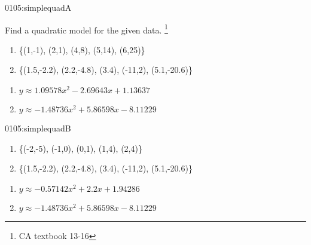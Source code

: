 
\begin{defproblem}{0105:simplequadA}
\begin{onlyproblem}
Find a quadratic model for the given data.
\footnote{CA textbook 13-16}
\begin{enumerate}
\item \{(1,-1), (2,1), (4,8), (5,14), (6,25)\}
\item \{(1.5,-2.2), (2.2,-4.8), (3.4), (-11,2), (5.1,-20.6)\}
\end{enumerate}%
\end{onlyproblem}%
\begin{onlysolution}%
\begin{enumerate}
\item $y\approx1.09578x^2-2.69643x+1.13637$
\item $y\approx-1.48736x^2+5.86598x-8.11229$
\end{enumerate}
\end{onlysolution}%
\end{defproblem}

\begin{defproblem}{0105:simplequadB}
\begin{onlyproblem}
\begin{enumerate}
\item \{(-2,-5), (-1,0), (0,1), (1,4), (2,4)\}
\item \{(1.5,-2.2), (2.2,-4.8), (3.4), (-11,2), (5.1,-20.6)\}
\end{enumerate}%
\end{onlyproblem}%
\begin{onlysolution}%
\begin{enumerate}
\item $y\approx-0.57142x^2+2.2x+1.94286$
\item $y\approx-1.48736x^2+5.86598x-8.11229$
 \end{enumerate}
\end{onlysolution}%
\end{defproblem}

